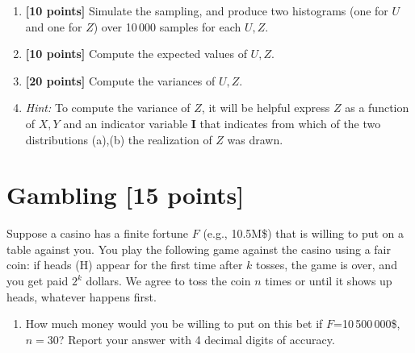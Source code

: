\begin{tcolorbox}
	\begin{enumerate}
		\item {\bf [10 points] } Simulate the sampling, and produce two histograms (one for $U$ and one for $Z$) over 10\,000 samples for each $U,Z$.    
		\item {\bf [10 points] } Compute the expected values of $U,Z$.
		\item {\bf [20 points] } Compute the variances  of $U,Z$.  
\item[] {\it Hint:} To compute the variance of $Z$, it will be helpful express $Z$ as a function of $X,Y$ and  an indicator variable {\bf I} that indicates from which of the two distributions (a),(b) the realization of $Z$ was drawn.
	\end{enumerate}
	
\end{tcolorbox}

\section{Gambling [15 points]} 

Suppose a casino has a finite fortune $F$  (e.g., 10.5M\$) that is willing to put on a table against you. You play the following game against the casino using a fair coin: if heads (H) appear for the first time after $k$ tosses, the game is over, and you get paid $2^k$ dollars. We agree to toss the coin $n$ times  or until it shows up heads, whatever happens first.   

\begin{tcolorbox}
\begin{enumerate}
    \item How much money would you be willing to put on this bet if $F$=10\,500\,000\$, $n=30$? Report your answer with 4 decimal digits of accuracy.  
\end{enumerate}
 
\end{tcolorbox}



